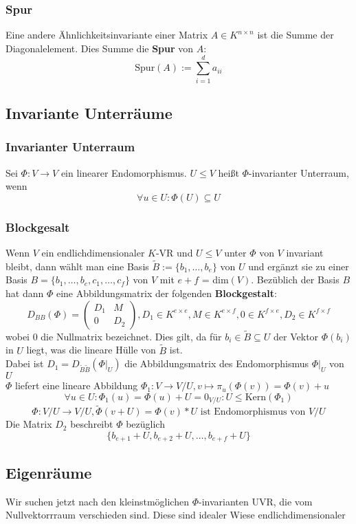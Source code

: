 \documentclass{kit}
\begin{document}
    \subsubsection{Spur}
      Eine andere Ähnlichkeitsinvariante einer Matrix $A\in K^{n\times n}$ ist die Summe der Diagonalelement. Dies Summe die \textbf{Spur} von $A$:
      $$\text{Spur}(A):=\sum_{i=1}^da_{ii}$$
  \subsection{Invariante Unterräume}
    \subsubsection{Invarianter Unterraum}
      Sei $\Phi:V\longrightarrow V$ ein linearer Endomorphismus. $U\le V$ heißt $\Phi$-invarianter Unterraum, wenn
      $$\forall u\in U:\Phi(U)\subseteq U$$
    \subsubsection{Blockgesalt}
      Wenn $V$ ein endlichdimensionaler $K$-VR und $U\le V$ unter $\Phi$ von $V$ invariant bleibt, dann wählt man eine Basis $\tilde B:=\{b_1,\dots,b_e\}$ von $U$ und ergänzt sie zu einer Basis $B=\{b_1,\dots,b_e,c_1,\dots,c_f\}$ von $V$ mit $e+f$ = dim$(V)$. 
      Bezüblich der Basis $B$ hat dann $\Phi$ eine Abbildungsmatrix der folgenden \textbf{Blockgestalt}:
      $$D_{BB}(\Phi)=\begin{pmatrix}
        D_1 & M\\
        0 & D_2
      \end{pmatrix}, D_1\in K^{e\times e}, M\in K^{e\times f}, 0\in K^{f\times e}, D_2\in K^{f\times f}$$
      wobei 0 die Nullmatrix bezeichnet. Dies gilt, da für $b_i\in\tilde B\subseteq U$ der Vektor $\Phi(b_i)$ in $U$ liegt, was die lineare Hülle von $\tilde B$ ist.\\
      Dabei ist $D_1=D_{\tilde B\tilde B}(\Phi|_U)$ die Abbildungsmatrix des Endomorphismus $\Phi|_U$ von $U$\\
      $\Phi$ liefert eine lineare Abbildung $\Phi_1:V\longrightarrow V/U,v\mapsto\pi_u(\Phi(v))=\Phi(v)+u$
      $$\forall u\in U:\Phi_1(u)=\Phi(u)+U=0_{V/U}:U\le \text{Kern}(\Phi_1)$$
      $$\Phi:V/U\longrightarrow V/U,\tilde\Phi(v+U)=\Phi(v)*U\text{ ist Endomorphismus von }V/U$$
      Die Matrix $D_2$ beschreibt $\Phi$ bezüglich
      $$\{b_{e+1}+U,b_{e+2}+U,\dots,b_{e+f}+U\}$$
  \subsection{Eigenräume}
    Wir suchen jetzt nach den kleinstmöglichen $\Phi$-invarianten UVR, die vom Nullvektorrraum verschieden sind. Diese sind idealer Wiese endlichdimensionaler
\end{document}
